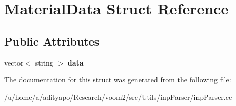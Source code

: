 \hypertarget{struct_material_data}{
\section{MaterialData Struct Reference}
\label{struct_material_data}
}
\subsection*{Public Attributes}
\begin{DoxyCompactItemize}
\item 
\hypertarget{struct_material_data_ac8d0f8f8b55e2d4280770bcdfc6ee307}{
vector$<$ string $>$ {\bfseries data}}
\label{struct_material_data_ac8d0f8f8b55e2d4280770bcdfc6ee307}

\end{DoxyCompactItemize}


The documentation for this struct was generated from the following file:\begin{DoxyCompactItemize}
\item 
/u/home/a/adityapo/Research/voom2/src/Utils/inpParser/inpParser.cc\end{DoxyCompactItemize}
